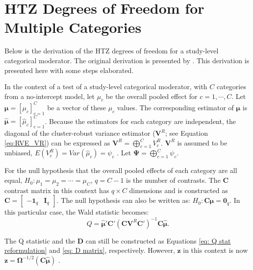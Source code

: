 
\chapter{HTZ Degrees of Freedom for Multiple Categories}\label{App: multiplecat}
\def\Pr{{\text{Pr}}}
\def\E{{\text{E}}}
\def\Var{{\text{Var}}}
\def\Cov{{\text{Cov}}}
\def\cor{{\text{cor}}}
\def\bm{\mathbf}
\def\bs{\boldsymbol}


Below is the derivation of the HTZ degrees of freedom for a study-level categorical moderator. The original derivation is presented by \textcite{pustejovsky2024}. This derivation is presented here with some steps elaborated. 

In the context of a test of a study-level categorical moderator, with $C$ categories from a no-intercept model, let $\mu_c$ be the overall pooled effect for $c=1,\cdots, C$. Let $\bm{\mu} = \left[\mu_c\right]_{c=1}^C$ be a vector of these $\mu_c$ values. The corresponding estimator of $\bm{\mu}$  is $\bm{\hat{\mu}} = \left[\hat{\mu}_c\right]_{c=1}^C$. Because the estimators for each category are independent, the diagonal of the cluster-robust variance estimator ($\bm{V}^R$; see Equation \ref{eq:RVE_VR}) can be expressed as $\bm{V}^R = \bigoplus_{c=1}^C V^R_c$.
$\bm{V}^R$ is assumed to be unbiased, $E(V_c^R) = Var(\hat{\mu}_c) = \psi_c$ \autocite{pustejovsky_wald_2025}. Let $\bs{\Psi} = \bigoplus_{c=1}^C \psi_c$.



For the null hypothesis that the overall pooled effects of each category are all equal,  $H_0: \mu_1 = \mu_2 = \cdots = \mu_C$,  $q=C-1$ is the number of contrasts. The $\mathbf{C}$ contrast matrix in this context has $q \times C$ dimensions and is constructed as $\mathbf{C} = \begin{bmatrix}
    -\mathbf{1}_q & \mathbf{I}_q
\end{bmatrix}$.  The null hypothesis can also be written as: $H_0:\mathbf{C}\bm{\mu} = \bm{0}_q$. In this particular case, the Wald statistic becomes:
\begin{equation}
    Q = \hat{\bm{\mu}}'\mathbf{C}'(\mathbf{C} \mathbf{V}^R \mathbf{C}')^{-1} \mathbf{C}\hat{\bm{\mu}}.
    \nonumber
\end{equation}

The Q statistic and the $\mathbf{D}$ can still be constructed as Equations \ref{eq: Q stat reformulation} and \ref{eq: D matrix}, respectively. However, $\mathbf{z}$ in this context is now $\mathbf{z} = \mathbf{\Omega}^{-1/2}(\mathbf{C}\bm{\hat{\mu}})$ \autocite{pustejovsky_wald_2025}.


